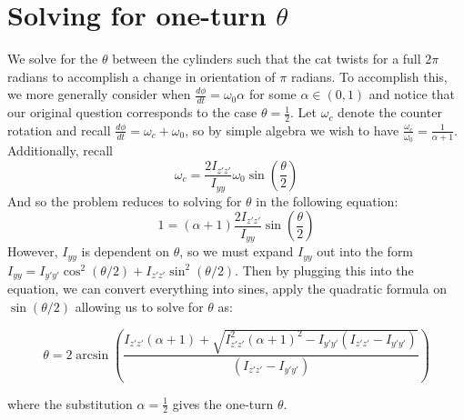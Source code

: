 \documentclass[12]{amsart}
\theoremstyle{definition}
\newcommand{\deriv}[2]{\frac{d#1}{d#2}}
\begin{document}
\section{Solving for one-turn $\theta$}

We solve for the $\theta$ between the cylinders such that the cat twists for a full $2\pi$ radians to accomplish a change in orientation of $\pi$ radians. To accomplish this, we more generally consider when $\deriv{\phi}{t} = \omega_0 \alpha$ for some $\alpha \in (0,1)$ and notice that our original question corresponds to the case $\theta = \frac{1}{2}$. Let $\omega_c$ denote the counter rotation and recall $\deriv{\phi}{t} = \omega_c + \omega_0$, so by simple algebra we wish to have $ \frac{\omega_c}{\omega_0} = \frac{1}{\alpha+1}$. Additionally, recall
\begin{equation*}
  \omega_c = \frac{2I_{z'z'}}{I_{yy}}\omega_0 \sin\left( \frac{\theta}{2} \right)
\end{equation*}
And so the problem reduces to solving for $\theta$ in the following equation: \begin{equation*}
  1 = (\alpha+1) \frac{2I_{z'z'}}{I_{yy}}\sin\left( \frac{\theta}{2} \right)
\end{equation*}
However, $I_{yy}$ is dependent on $\theta$, so we must expand $I_{yy}$ out into the form $I_{yy} = I_{y'y'} \cos^2(\theta/2) + I_{z'z'} \sin^2(\theta/2)$.
Then by plugging this into the equation, we can convert everything into sines, apply the quadratic formula on $\sin(\theta/2)$ allowing us to solve for $\theta$ as:

\begin{equation*}
  \theta = 2\arcsin \left( \frac{I_{z'z'}(\alpha+1) + \sqrt{I_{z'z'}^2(\alpha+1)^2-I_{y'y'}(I_{z'z'}-I_{y'y'})}}{(I_{z'z'}-I_{y'y'})} \right)
\end{equation*}

where the substitution $\alpha = \frac{1}{2}$ gives the one-turn $\theta$.
\end{document}
